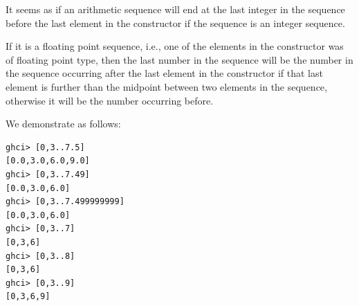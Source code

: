 It seems as if an arithmetic sequence will end at the last 
integer in the sequence before the last element in the constructor if the 
sequence is an integer sequence.\par
\qquad If it is a floating point sequence, i.e., one of the elements in the 
constructor was of floating point type, then the last number in the sequence 
will be the number in the sequence occurring after the last element in the 
constructor if that last element is further than the midpoint between two 
elements in the sequence, otherwise it will be the number occurring before.\par
We demonstrate as follows:
\begin{lstlisting}
ghci> [0,3..7.5]
[0.0,3.0,6.0,9.0]
ghci> [0,3..7.49]
[0.0,3.0,6.0]
ghci> [0,3..7.499999999]
[0.0,3.0,6.0]
ghci> [0,3..7]
[0,3,6]
ghci> [0,3..8]
[0,3,6]
ghci> [0,3..9]
[0,3,6,9]
\end{lstlisting}
